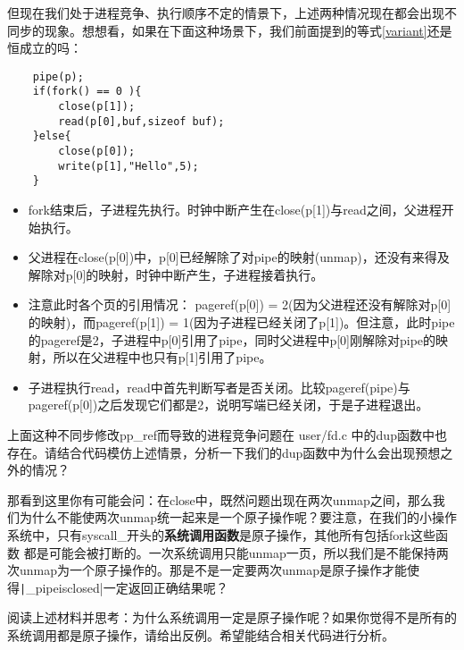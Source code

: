 但现在我们处于进程竞争、执行顺序不定的情景下，上述两种情况现在都会出现不同步的现象。想想看，如果在下面这种场景下，我们前面提到的等式\ref{variant}还是恒成立的吗：

\label{code:example-pipe}
\begin{verbatim}
	pipe(p);
	if(fork() == 0 ){
		close(p[1]);
		read(p[0],buf,sizeof buf);
	}else{
		close(p[0]);
		write(p[1],"Hello",5);
	}
\end{verbatim}

\begin{itemize}
	\item  fork结束后，子进程先执行。时钟中断产生在close(p[1])与read之间，父进程开始执行。
	\item 父进程在close(p[0])中，p[0]已经解除了对pipe的映射(unmap)，还没有来得及解除对p[0]的映射，时钟中断产生，子进程接着执行。
	\item 注意此时各个页的引用情况： pageref(p[0]) = 2(因为父进程还没有解除对p[0]的映射)，而pageref(p[1]) = 1(因为子进程已经关闭了p[1])。但注意，此时pipe的pageref是2，子进程中p[0]引用了pipe，同时父进程中p[0]刚解除对pipe的映射，所以在父进程中也只有p[1]引用了pipe。
	\item 子进程执行read，read中首先判断写者是否关闭。比较pageref(pipe)与pageref(p[0])之后发现它们都是2，说明写端已经关闭，于是子进程退出。
\end{itemize}

\begin{thinking}\label{think-dup}
	上面这种不同步修改pp\_ref而导致的进程竞争问题在 user/fd.c 中的dup函数中也存在。请结合代码模仿上述情景，分析一下我们的dup函数中为什么会出现预想之外的情况？
\end{thinking}


那看到这里你有可能会问：在close中，既然问题出现在两次unmap之间，那么我们为什么不能使两次unmap统一起来是一个原子操作呢？要注意，在我们的小操作系统中，只有syscall\_开头的\textbf{系统调用函数}是原子操作，其他所有包括fork这些函数%
都是可能会被打断的。一次系统调用只能unmap一页，所以我们是不能保持两次unmap为一个原子操作的。那是不是一定要两次unmap是原子操作才能使得\texttt|_pipeisclosed|一定返回正确结果呢？

\begin{thinking}\label{think-automatic}
	阅读上述材料并思考：为什么系统调用一定是原子操作呢？如果你觉得不是所有的系统调用都是原子操作，请给出反例。希望能结合相关代码进行分析。
\end{thinking}

